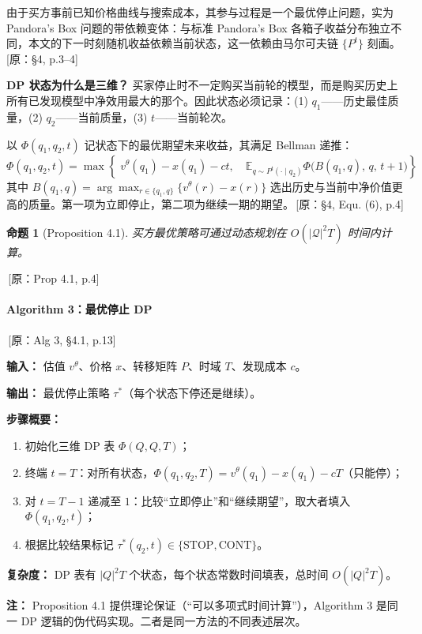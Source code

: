 \documentclass[12pt,a4paper]{article}
\newcommand{\srcref}[1]{\textcolor{black!65}{\footnotesize\,[原：#1]}}
\newtheorem{proposition}[theorem]{命题}
\theoremstyle{definition}
\begin{document}
由于买方事前已知价格曲线与搜索成本，其参与过程是一个最优停止问题，实为 Pandora's Box 问题的带依赖变体：与标准 Pandora's Box 各箱子收益分布独立不同，本文的下一时刻随机收益依赖当前状态，这一依赖由马尔可夫链 $\{P^t\}$ 刻画。\srcref{§4, p.3--4}

\textbf{DP 状态为什么是三维？} 买家停止时不一定购买当前轮的模型，而是购买历史上所有已发现模型中净效用最大的那个。因此状态必须记录：(1) $q_1$——历史最佳质量，(2) $q_2$——当前质量，(3) $t$——当前轮次。

以 $\Phi(q_1,q_2,t)$ 记状态下的最优期望未来收益，其满足 Bellman 递推：
\[
\Phi(q_1,q_2,t) = \max\left\{
\; v^\theta(q_1)-x(q_1)-c t,\quad
\mathbb{E}_{q \sim P^t(\cdot\mid q_2)} \Phi\big(B(q_1,q),\, q,\, t+1\big)
\right\}
\]
其中 $B(q_1,q) = \arg\max_{r\in\{q_1,q\}}\{v^\theta(r)-x(r)\}$ 选出历史与当前中净价值更高的质量。第一项为立即停止，第二项为继续一期的期望。\srcref{§4, Equ. (6), p.4}

\begin{proposition}[Proposition 4.1]
买方最优策略可通过动态规划在 $O(|\mathcal{Q}|^2 T)$ 时间内计算。
\end{proposition}
\srcref{Prop 4.1, p.4}

\paragraph{Algorithm 3：最优停止 DP} \srcref{Alg 3, §4.1, p.13}

\textbf{输入：} 估值 $v^\theta$、价格 $x$、转移矩阵 $P$、时域 $T$、发现成本 $c$。

\textbf{输出：} 最优停止策略 $\tau^*$（每个状态下停还是继续）。

\textbf{步骤概要：}
\begin{enumerate}[leftmargin=*,nosep]
    \item 初始化三维 DP 表 $\Phi(Q,Q,T)$；
    \item 终端 $t=T$：对所有状态，$\Phi(q_1,q_2,T)=v^\theta(q_1)-x(q_1)-cT$（只能停）；
    \item 对 $t = T-1$ 递减至 $1$：比较``立即停止''和``继续期望''，取大者填入 $\Phi(q_1,q_2,t)$；
    \item 根据比较结果标记 $\tau^*(q_2,t) \in \{\text{STOP}, \text{CONT}\}$。
\end{enumerate}

\textbf{复杂度：} DP 表有 $|Q|^2 T$ 个状态，每个状态常数时间填表，总时间 $O(|Q|^2 T)$。

\textbf{注：} Proposition 4.1 提供理论保证（``可以多项式时间计算''），Algorithm 3 是同一 DP 逻辑的伪代码实现。二者是同一方法的不同表述层次。
\end{document}
